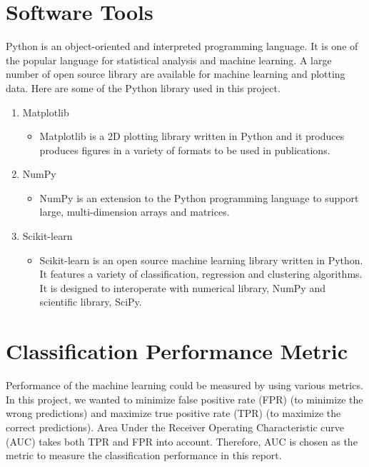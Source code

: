 \section{Software Tools}
Python\citep{Rossum:1995:PRM:869369} is an object-oriented and interpreted programming language. It is one of the popular language for statistical analysis and machine learning. A large number of open source library are available for machine learning and plotting data. Here are some of the Python library used in this project.

\begin{enumerate}
    \item Matplotlib
        \begin{itemize}
            \item Matplotlib \citep{Hunter:2007} is a 2D plotting library written in Python and it produces produces figures in a variety of formats to be used in publications.
        \end{itemize}
    \item NumPy
        \begin{itemize}
            \item NumPy \citep{developersnumpy} is an extension to the Python programming language to support large, multi-dimension arrays and matrices.
        \end{itemize}
    \item Scikit-learn
        \begin{itemize}
            \item Scikit-learn \citep{scikit-learn} is an open source machine learning library written in Python. It features a variety of classification, regression and clustering algorithms. It is designed to interoperate with numerical library, NumPy and scientific library, SciPy.
        \end{itemize}
\end{enumerate}

\section{Classification Performance Metric}
Performance of the machine learning could be measured by using various metrics. In this project, we wanted to minimize false positive rate (FPR) (to minimize the wrong predictions) and maximize true positive rate (TPR) (to maximize the correct predictions). Area Under the Receiver Operating Characteristic curve (AUC) takes both TPR and FPR into account. Therefore, AUC is chosen as the metric to measure the classification performance in this report.